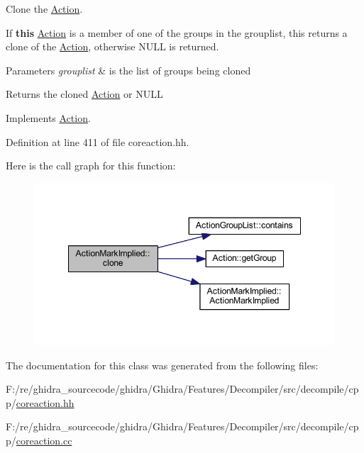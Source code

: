 Clone the \mbox{\hyperlink{class_action}{Action}}. 

If {\bfseries{this}} \mbox{\hyperlink{class_action}{Action}} is a member of one of the groups in the grouplist, this returns a clone of the \mbox{\hyperlink{class_action}{Action}}, otherwise N\+U\+LL is returned. 
\begin{DoxyParams}{Parameters}
{\em grouplist} & is the list of groups being cloned \\
\hline
\end{DoxyParams}
\begin{DoxyReturn}{Returns}
the cloned \mbox{\hyperlink{class_action}{Action}} or N\+U\+LL 
\end{DoxyReturn}


Implements \mbox{\hyperlink{class_action_af8242e41d09e5df52f97df9e65cc626f}{Action}}.



Definition at line 411 of file coreaction.\+hh.

Here is the call graph for this function\+:
\nopagebreak
\begin{figure}[H]
\begin{center}
\leavevmode
\includegraphics[width=348pt]{class_action_mark_implied_a62ce03beb8aa31dd00531c48d6ce5510_cgraph}
\end{center}
\end{figure}


The documentation for this class was generated from the following files\+:\begin{DoxyCompactItemize}
\item 
F\+:/re/ghidra\+\_\+sourcecode/ghidra/\+Ghidra/\+Features/\+Decompiler/src/decompile/cpp/\mbox{\hyperlink{coreaction_8hh}{coreaction.\+hh}}\item 
F\+:/re/ghidra\+\_\+sourcecode/ghidra/\+Ghidra/\+Features/\+Decompiler/src/decompile/cpp/\mbox{\hyperlink{coreaction_8cc}{coreaction.\+cc}}\end{DoxyCompactItemize}
